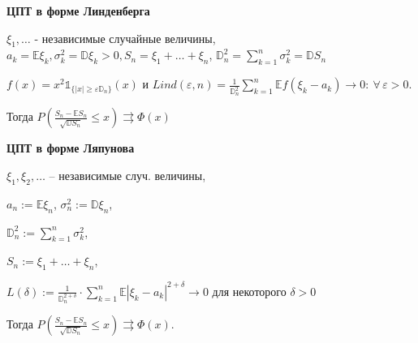 \begin{theorem}
    \textbf{ЦПТ в форме Линденберга}

    $\xi_1, \ldots$ - независимые случайные величины, $a_k = \mathbb{E} \xi_k, \sigma_k^2 = \mathbb{D} \xi_k > 0, S_n = \xi_1 + \ldots + \xi_n$, $\mathbb{D}_n^2 = \sum_{k = 1}^n \sigma_k^2 = \mathbb{D} S_n$

    $f(x) = x^2 \mathds{1}_{\{ |x| \geqslant \varepsilon \mathbb{D}_n \} } (x)$ и $Lind (\varepsilon, n) = \frac{1}{\mathbb{D}_n^2} \sum_{k = 1}^n \mathbb{E} f (\xi_k - a_k) \rightarrow 0: \ \forall \, \varepsilon > 0$.

    Тогда $P \left( \frac{S_n - \mathbb{E} S_n}{\sqrt{\mathbb{D} S_n}} \leqslant x \right) \rightrightarrows \Phi (x)$
\end{theorem}

\begin{theorem}
    \textbf{ЦПТ в форме Ляпунова}




    $\xi_1, \xi_2, \ldots$ -- независимые случ. величины,

    $a_n := \mathbb{E} \xi_n$, $\sigma_n^2 := \mathbb{D} \xi_n$,

    $\mathbb{D}^2_n := \sum_{k = 1}^{n} \sigma_k^2$,

    $S_n := \xi_1 + \ldots + \xi_n$,

    $L(\delta) := \frac{1}{\mathbb{D}_n^{2 + \delta}} \cdot \sum_{k=1}^n \mathbb{E} |\xi_k - a_k|^{2 + \delta} \to 0$ для некоторого $\delta > 0$

    Тогда $P\left( \frac{S_n - \mathbb{E} S_n}{\sqrt{ \mathbb{D} S_n }} \leq x \right) \rightrightarrows \Phi(x)$.

\end{theorem}

